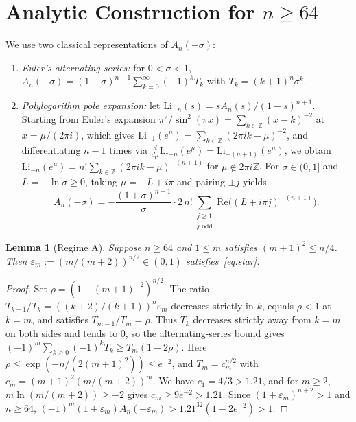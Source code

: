 \documentclass[11pt]{article}
\newtheorem{lemma}[theorem]{Lemma}
\begin{document}
\section{Analytic Construction for $n \ge 64$}

We use two classical representations of $A_n(-\sigma)$:
\begin{enumerate}
  \item \emph{Euler's alternating series:} for $0 < \sigma < 1$, $A_n(-\sigma) = (1 + \sigma)^{n+1} \sum_{k=0}^{\infty} (-1)^k T_k$ with $T_k = (k + 1)^n \sigma^k$.
  \item \emph{Polylogarithm pole expansion:} let $\mathrm{Li}_{-n}(s) = s A_n(s) / (1 - s)^{n+1}$. Starting from Euler's expansion $\pi^2 / \sin^2(\pi x) = \sum_{k \in \mathbb{Z}} (x - k)^{-2}$ at $x = \mu / (2\pi i)$, which gives $\mathrm{Li}_{-1}(e^\mu) = \sum_{k \in \mathbb{Z}} (2\pi i k - \mu)^{-2}$, and differentiating $n - 1$ times via $\frac{d}{d\mu}\mathrm{Li}_{-n}(e^\mu) = \mathrm{Li}_{-(n+1)}(e^\mu)$, we obtain $\mathrm{Li}_{-n}(e^\mu) = n! \sum_{k \in \mathbb{Z}} (2\pi i k - \mu)^{-(n+1)}$ for $\mu \notin 2\pi i\mathbb{Z}$. For $\sigma \in (0, 1]$ and $L = -\ln\sigma \ge 0$, taking $\mu = -L + i\pi$ and pairing $\pm j$ yields
  \begin{equation}\label{eq:pole}
    A_n(-\sigma) = -\frac{(1 + \sigma)^{n+1}}{\sigma} \cdot 2\, n! \sum_{\substack{j \ge 1 \\ j\text{ odd}}} \mathrm{Re}\bigl((L + i\pi j)^{-(n+1)}\bigr).
  \end{equation}
\end{enumerate}

\begin{lemma}[Regime A]\label{lem:A}
Suppose $n \ge 64$ and $1 \le m$ satisfies $(m + 1)^2 \le n / 4$. Then $\varepsilon_m := (m / (m + 2))^{n/2} \in (0, 1)$ satisfies~\eqref{eq:star}.
\end{lemma}

\begin{proof}
Set $\rho = (1 - (m + 1)^{-2})^{n/2}$. The ratio $T_{k+1}/T_k = ((k + 2)/(k + 1))^n \varepsilon_m$ decreases strictly in $k$, equals $\rho < 1$ at $k = m$, and satisfies $T_{m-1}/T_m = \rho$. Thus $T_k$ decreases strictly away from $k = m$ on both sides and tends to $0$, so the alternating-series bound gives $(-1)^m \sum_{k \ge 0} (-1)^k T_k \ge T_m(1 - 2\rho)$. Here $\rho \le \exp(-n/(2(m+1)^2)) \le e^{-2}$, and $T_m = c_m^{n/2}$ with $c_m = (m + 1)^2 (m / (m + 2))^m$. We have $c_1 = 4/3 > 1.21$, and for $m \ge 2$, $m \ln(m / (m + 2)) \ge -2$ gives $c_m \ge 9 e^{-2} > 1.21$. Since $(1 + \varepsilon_m)^{n+2} > 1$ and $n \ge 64$, $(-1)^m(1 + \varepsilon_m) A_n(-\varepsilon_m) > 1.21^{32}(1 - 2e^{-2}) > 1$.
\end{proof}
\end{document}
